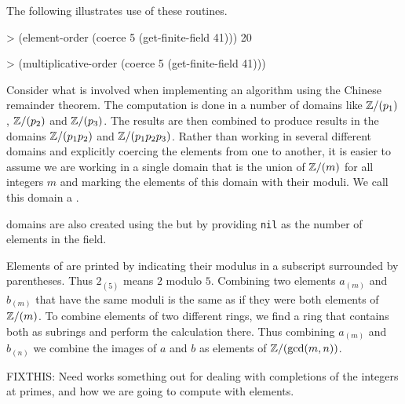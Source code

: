 The following illustrates use of these routines.
\begin{code}
> (element-order (coerce 5 (get-finite-field 41)))
20

> (multiplicative-order (coerce 5 (get-finite-field 41)))
\end{code}

\medskip
Consider what is involved when implementing an algorithm using the
Chinese remainder theorem. The computation is done in a number of
domains like ${\Bbb Z}/(p_1)$, ${\Bbb Z}/(p_2)$ and ${\Bbb Z}/(p_3)$.  The results are
then combined to produce results in the domains ${\Bbb Z}/(p_1p_2)$ and
${\Bbb Z}/(p_1p_2p_3)$.  Rather than working in several different domains
and explicitly coercing the elements from one to another, it is easier
to assume we are working in a single domain that is the union of
${\Bbb Z}/(m)$ for all integers $m$ and marking the elements of this domain
with their moduli.  We call this domain a .

 domains are also created using the 
but by providing {\tt nil} as the number of elements in the field.

Elements of  are printed by indicating their modulus in a
subscript surrounded by parentheses.  Thus $2_{(5)}$ means $2$ modulo
$5$.  Combining two elements $a_{(m)}$ and $b_{(m)}$ that have the
same moduli is the same as if they were both elements of ${\Bbb Z}/(m)$.  To
combine elements of two different rings, we find a ring that contains
both as subrings and perform the calculation there.  Thus combining
$a_{(m)}$ and $b_{(n)}$ we combine the images of $a$ and $b$ as
elements of ${\Bbb Z}/(\gcd(m,n))$.



FIXTHIS: Need works something out for dealing with completions of the
integers at primes, and how we are going to compute with elements.

